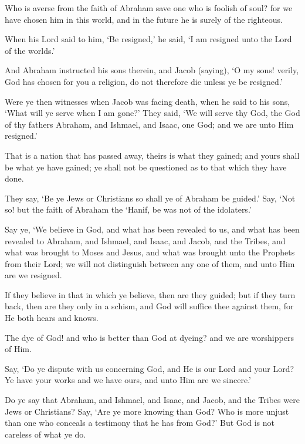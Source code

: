 \documentclass[fontsize=14pt, letterpaper, notitlepage, openany, DIV=12]{scrbook} %
\begin{document}
\noindent[2:130]
Who is averse from the faith of Abraham save one who is foolish of soul? for we have
chosen him in this world, and in the future he is surely of the righteous.

\noindent[2:131]
When his Lord said to him, `Be resigned,' he said, `I am resigned unto the Lord of the
worlds.'

\noindent[2:132]
And Abraham instructed his sons therein, and Jacob (saying), `O my sons! verily, God
has chosen for you a religion, do not therefore die unless ye be resigned.'

\noindent[2:133]
Were ye then witnesses when Jacob was facing death, when he said to his sons, `What
will ye serve when I am gone?' They said, `We will serve thy God, the God of thy fathers
Abraham, and Ishmael, and Isaac, one God; and we are unto Him resigned.'

\noindent[2:134]
That is a nation that has passed away, theirs is what they gained; and yours shall be what
ye have gained; ye shall not be questioned as to that which they have done.

\noindent[2:135]
They say, `Be ye Jews or Christians so shall ye of Abraham be guided.' Say, `Not so! but
the faith of Abraham the `Hanif, be was not of the idolaters.'

\noindent[2:136]
Say ye, `We believe in God, and what has been revealed to us, and what has been
revealed to Abraham, and Ishmael, and Isaac, and Jacob, and the Tribes, and what was brought
to Moses and Jesus, and what was brought unto the Prophets from their Lord; we will not
distinguish between any one of them, and unto Him are we resigned.

\noindent[2:137]
If they believe in that in which ye believe, then are they guided; but if they turn back,
then are they only in a schism, and God will suffice thee against them, for He both hears and
knows.

\noindent[2:138]
The dye of God! and who is better than God at dyeing? and we are worshippers of Him.

\noindent[2:139]
Say, `Do ye dispute with us concerning God, and He is our Lord and your Lord? Ye have
your works and we have ours, and unto Him are we sincere.'

\noindent[2:140]
Do ye say that Abraham, and Ishmael, and Isaac, and Jacob, and the Tribes were Jews or
Christians? Say, `Are ye more knowing than God? Who is more unjust than one who conceals a
testimony that he has from God?' But God is not careless of what ye do.
\end{document}
